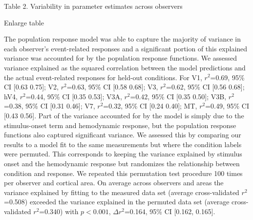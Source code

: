 \documentclass{report}
\begin{document}
Table 2. Variability in parameter estimates across observers

Enlarge table

The population response model was able to capture the majority of variance in each observer’s event-related responses and a significant portion of this explained variance was accounted for by the population response functions. We assessed variance explained as the squared correlation between the model predictions and the actual event-related responses for held-out conditions. For V1, $r^2$=0.69, 95\% CI [0.63 0.75]; V2, $r^2$=0.63, 95\% CI [0.58 0.68]; V3, $r^2$=0.62, 95\% CI [0.56 0.68]; hV4, $r^2$=0.44, 95\% CI [0.35 0.53]; V3A, $r^2$=0.42, 95\% CI [0.35 0.50]; V3B, $r^2$=0.38, 95\% CI [0.31 0.46]; V7, $r^2$=0.32, 95\% CI [0.24 0.40]; MT, $r^2$=0.49, 95\% CI [0.43 0.56]. Part of the variance accounted for by the model is simply due to the stimulus-onset term and hemodynamic response, but the population response functions also captured significant variance. We assessed this by comparing our results to a model fit to the same measurements but where the condition labels were permuted. This corresponds to keeping the variance explained by stimulus onset and the hemodynamic response but randomizes the relationship between condition and response. We repeated this permutation test procedure 100 times per observer and cortical area. On average across observers and areas the variance explained by fitting to the measured data set (average cross-validated $r^2$=0.508) exceeded the variance explained in the permuted data set (average cross-validated $r^2$=0.340) with $p < 0.001$, $\Delta r^2$=0.164, 95\% CI [0.162, 0.165].
\end{document}
